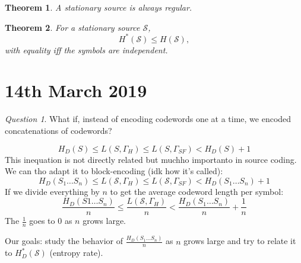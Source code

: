 \documentclass{report}
\theoremstyle{plain}
\newtheorem{thm}{Theorem}
\theoremstyle{definition}
\theoremstyle{remark}
\newtheorem*{question}{Question}
\begin{document}
\begin{thm}
	A stationary source is always regular.
\end{thm}

\begin{thm}
	For a stationary source $\mathcal S$,
	\begin{equation}
		H^*(\mathcal S) \leq H(\mathcal S),
	\end{equation}
	with equality iff the symbols are independent.
\end{thm}

\section{14th March 2019}
\begin{question}
	What if, instead of encoding codewords one at a time, we encoded concatenations of codewords?
\end{question}

\begin{equation}
	\boxed{H_D(S) \leq L(S, \Gamma_H) \leq L(S, \Gamma_{SF}) < H_D(S) + 1}
\end{equation}
This inequation is not directly related but muchho importanto in source coding. We can tho adapt it to block-encoding (idk how it's called):
\begin{equation}
	H_D(S_1 \ldots S_n) \leq L(\mathcal S, \Gamma_H) \leq L(\mathcal S, \Gamma_{SF}) < H_D(S_1 \ldots S_n) + 1
\end{equation}
If we divide everything by $n$ to get the average codeword length per symbol:
\begin{equation}
	\frac{H_D(S1 \ldots S_n)}{n} \leq \frac{L(\mathcal S, \Gamma_H)}{n} < \frac{H_D(S_1 \ldots S_n)}{n} + \frac1n
\end{equation}
The $\frac1n$ goes to 0 as $n$ grows large. \par
Our goals: study the behavior of $\frac{H_D(S_1 \ldots S_n)}{n}$ as $n$ grows large and try to relate it to $H_D^*(\mathcal S)$ (entropy rate).
\end{document}

